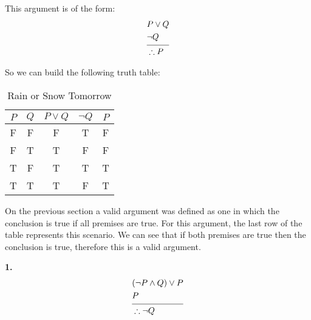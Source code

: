 This argument is of the form: 
\begin{align*}
    &P \lor Q\\
    &\neg Q\\
          \noalign{\vspace{-8pt}}
          \cline{1-2}
          \noalign{\vspace{-4pt}}
    &\therefore P\\
\end{align*}

So we can build the following truth table:

\begin{table}[h]
\centering
\label{tab:snow_or_rain }
\begin{tabular}{|c|c|c|c|c|}
  \hline
  $P$ & $Q$ & $P \lor Q$ & $\neg Q$ & $P$\\
  \hline 
  F & F & F & T & F\\ 
  F & T & T & F & F\\  
  T & F & T & T & T\\  
  T & T & T & F & T\\
  \hline
\end{tabular}
\caption{Rain or Snow Tomorrow}
\end{table}

On the previous section a valid argument was defined as one in which the conclusion is true if all premises are true. 
For this argument, the last row of the table represents this scenario. 
We can see that if both premises are true then the conclusion is true, therefore this is a valid argument. 


\sol \textbf{1.} 
  \begin{align*}
      &(\neg P \land Q) \lor P\\
      &P\\
            \noalign{\vspace{-8pt}}
            \cline{1-2}
            \noalign{\vspace{-4pt}}
      &\therefore \neg Q\\
  \end{align*}

